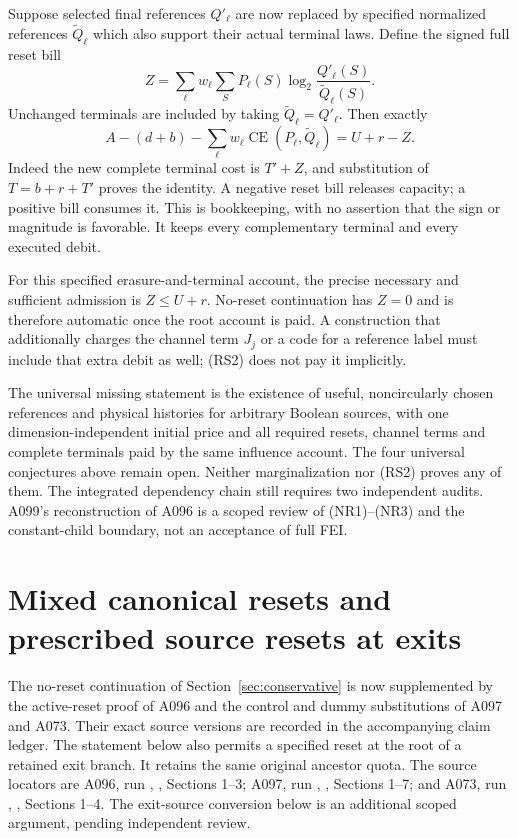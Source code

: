 \documentclass[11pt]{article}
\newcommand{\CE}{\operatorname{CE}}
\begin{document}
Suppose selected final references $Q'_\ell$ are now replaced by
specified normalized references $\widetilde Q_\ell$ which also
support their actual terminal laws. Define the signed full reset
bill
\[
 Z=\sum_\ell w_\ell\sum_S P_\ell(S)
                \log_2\frac{Q'_\ell(S)}{\widetilde Q_\ell(S)}.
 \tag{RS1}
\]
Unchanged terminals are included by taking
$\widetilde Q_\ell=Q'_\ell$. Then exactly
\[
 A-(d+b)-\sum_\ell w_\ell\CE(P_\ell,\widetilde Q_\ell)
       =U+r-Z.
 \tag{RS2}
\]
Indeed the new complete terminal cost is $T'+Z$, and substitution
of $T=b+r+T'$ proves the identity. A negative reset bill releases
capacity; a positive bill consumes it. This is bookkeeping, with
no assertion that the sign or magnitude is favorable. It keeps
every complementary terminal and every executed debit.

For this specified erasure-and-terminal account, the precise
necessary and sufficient admission is $Z\le U+r$. No-reset
continuation has $Z=0$ and is therefore automatic once the root
account is paid. A construction that additionally charges the
channel term $J_j$ or a code for a reference label must include
that extra debit as well; (RS2) does not pay it implicitly.

The universal missing statement is the existence of useful,
noncircularly chosen references and physical histories for arbitrary
Boolean sources, with one dimension-independent initial price and
all required resets, channel terms and complete terminals paid by
the same influence account. The four universal conjectures above
remain open. Neither marginalization nor (RS2) proves any of them.
The integrated dependency chain still requires two independent
audits. A099's reconstruction of A096 is a scoped review of (NR1)--(NR3)
and the constant-child boundary, not an acceptance of full FEI.

\section{Mixed canonical resets and prescribed source resets at exits}
\label{sec:mixedexits}
The no-reset continuation of Section~\ref{sec:conservative} is now
supplemented by the active-reset proof of A096 and the control and
dummy substitutions of A097 and A073. Their exact source versions
are recorded in the accompanying claim ledger. The statement below
also permits a specified reset at the root of a retained exit branch.
It retains the same original ancestor quota.
The source locators are A096, run
,
, Sections 1--3; A097, run
,
, Sections 1--7; and A073, run
,
, Sections 1--4. The exit-source conversion
below is an additional scoped argument, pending independent review.
\end{document}
